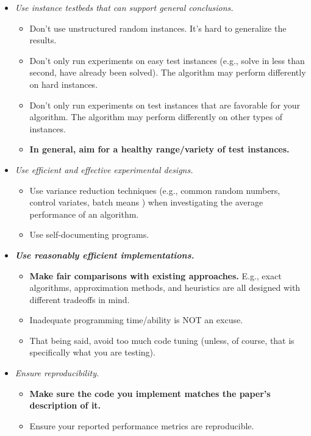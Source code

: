 \documentclass[12pt]{article}
\begin{document}
\begin{itemize}
    \item \emph{Use instance testbeds that can support general conclusions.}
        \begin{itemize}
            \item Don't use unstructured random instances. It's hard to generalize the results.
            \item Don't only run experiments on easy test instances (e.g., solve in less than second, have already been solved).  The algorithm may perform differently on hard instances.
            \item Don't only run experiments on test instances that are favorable for your algorithm.  The algorithm may perform differently on other types of instances.
            \item \textbf{In general, aim for a healthy range/variety of test instances.}
        \end{itemize}
    \item \emph{Use efficient and effective experimental designs.}
        \begin{itemize}
            \item Use variance reduction techniques (e.g., common random numbers, control variates, batch means \cite{mcgeoch1992analyzing, fishman1997implementation}) when investigating the average performance of an algorithm.
            \item Use self-documenting programs.
        \end{itemize}
    \item \textbf{\emph{Use reasonably efficient implementations.}}
        \begin{itemize}
            \item \textbf{Make fair comparisons with existing approaches.} E.g., exact algorithms, approximation methods, and heuristics are all designed with different tradeoffs in mind.
            \item Inadequate programming time/ability is NOT an excuse.
            \item That being said, avoid too much code tuning (unless, of course, that is specifically what you are testing).
        \end{itemize}
    \item \emph{Ensure reproducibility.}
        \begin{itemize}
            \item \textbf{Make sure the code you implement matches the paper's description of it.}
            \item Ensure your reported performance metrics are reproducible.

\end{itemize}
\end{itemize}
\end{document}
